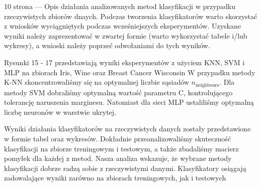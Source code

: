 \documentclass[12pt]{article}
\begin{document}
\clearpage

10 strona --- Opis działania analizowanych metod klasyfikacji w przypadku rzeczywistych zbiorów dnaych. 
Podczas tworzenia klasyfikatorów warto skorzystać z wniosków wyciągniętych podczas wcześniejszych eksperymentów. 
Uzyskane wyniki należy zaprezentować w zwartej formie (warto wykorzystać tabele i/lub wykresy), 
a wnioski należy poprzeć odwołaniami do tych wyników.

Rysunki 15 - 17 przedstawiają wyniki eksperymentów z użyciem KNN, SVM i MLP na zbiorach Iris, Wine oraz Breast Cancer Wisconsin
W przypadku metody K-NN skoncentrowaliśmy się na optymalnej liczbie sąsiadów \(n_{\text{neighbours}}\). Dla metody SVM dobraliśmy optymalną 
wartość parametru C, kontrolującego tolerancję naruszenia marginesu. Natomiast dla sieci MLP ustaliliśmy optymalną liczbę neuronów 
w warstwie ukrytej.

Wyniki działania klasyfikatorów na rzeczywistych danych zostały przedstawione w formie tabel oraz wykresów. 
Dokładnie przeanalizowaliśmy 
skuteczność klasyfikacji na zbiorze treningowym i testowym, a także zbadaliśmy macierz pomyłek dla każdej z metod. Nasza analiza wskazuje, 
że wybrane metody klasyfikacji dobrze radzą sobie z rzeczywistymi danymi. Klasyfikatory osiągają zadowalające wyniki zarówno na zbiorach 
treningowych, jak i testowych
\end{document}
